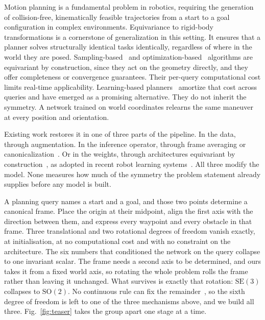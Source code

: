 \documentclass[10pt,twocolumn,letterpaper]{article}
\newcommand{\SE}{\mathrm{SE}(3)}
\begin{document}
Motion planning is a fundamental problem in robotics, requiring the generation of
collision-free, kinematically feasible trajectories from a start to a goal
configuration in complex environments. Equivariance to rigid-body transformations
is a cornerstone of generalization in this setting. It ensures that a planner
solves structurally identical tasks identically, regardless of where in the world
they are posed. Sampling-based~\cite{kuffner2000rrtconnect} and
optimization-based~\cite{schulman2014trajopt,zucker2013chomp} algorithms are
equivariant by construction, since they act on the geometry directly, and they
offer completeness or convergence guarantees. Their per-query computational cost
limits real-time applicability. Learning-based
planners~\cite{carvalho2023mpd,fishman2022mpinets,janner2022diffuser,qureshi2019mpnet}
amortize that cost across queries and have emerged as a promising alternative.
They do not inherit the symmetry. A network trained on world coordinates relearns
the same maneuver at every position and orientation.

Existing work restores it in one of three parts of the pipeline. In the data,
through augmentation. In the inference operator, through frame averaging or
canonicalization~\cite{kaba2023canon,puny2022fa}. Or in the weights, through
architectures equivariant by
construction~\cite{cohen2016gcnn,deng2021vn,fuchs2020se3t,thomas2018tfn}, as
adopted in recent robot learning
systems~\cite{ryu2023edf,simeonov2022ndf,wang2024equidp,yang2024equibot}. All
three modify the model. None measures how much of the symmetry the problem
statement already supplies before any model is built.

A planning query names a start and a goal, and those two points determine a canonical
frame. Place the origin at their midpoint, align the first axis with the
direction between them, and express every waypoint and every obstacle in that
frame. Three translational and two rotational degrees of freedom vanish exactly,
at initialisation, at no computational cost and with no constraint on the
architecture. The six numbers that conditioned the network on the query collapse
to one invariant scalar. The frame needs a second axis to be determined, and ours
takes it from a fixed world axis, so rotating the whole problem rolls the frame
rather than leaving it unchanged. What survives is exactly that rotation: $\SE$
collapses to $\mathrm{SO}(2)$. No continuous rule can fix the
remainder~\cite{milnor1978hairy}, so the sixth degree of freedom is left to one
of the three mechanisms above, and we build all three. Fig.~\ref{fig:teaser} takes the group apart
one stage at a time.
\end{document}
